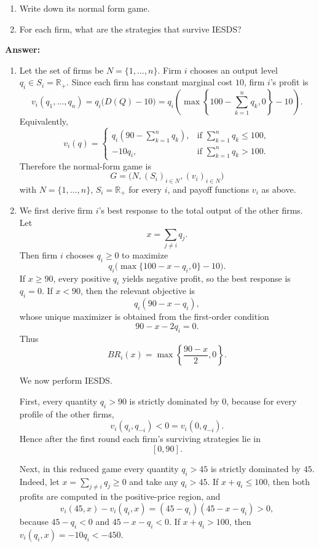 \documentclass[12pt,a4paper]{article}
\begin{document}
\vspace{0.5cm}

\begin{enumerate}[label=(\alph*)]
  \item Write down its normal form game.
  \item For each firm, what are the strategies that survive IESDS?
\end{enumerate}

\vspace{0.5cm}

\noindent\textbf{Answer:}
\begin{enumerate}[label=(\alph*)]
  \item Let the set of firms be $N=\{1,\dots,n\}$. Firm $i$ chooses an output level $q_i\in S_i=\mathbb{R}_{+}$. 
  Since each firm has constant marginal cost $10$, firm $i$'s profit is
  \[
    v_i(q_1,\dots,q_n)=q_i\bigl(D(Q)-10\bigr)
    =q_i\left(\max\left\{100-\sum_{k=1}^n q_k,0\right\}-10\right).
  \]
  Equivalently,
  \[
    v_i(q)=
    \begin{cases}
      q_i\left(90-\sum_{k=1}^n q_k\right), & \text{if } \sum_{k=1}^n q_k\le 100,\\[6pt]
      -10q_i, & \text{if } \sum_{k=1}^n q_k>100.
    \end{cases}
  \]
  Therefore the normal-form game is
  \[
    G=\bigl(N,(S_i)_{i\in N},(v_i)_{i\in N}\bigr)
  \]
  with $N=\{1,\dots,n\}$, $S_i=\mathbb{R}_{+}$ for every $i$, and payoff functions $v_i$ as above.

  \item We first derive firm $i$'s best response to the total output of the other firms. Let
  \[
    x=\sum_{j\ne i} q_j.
  \]
  Then firm $i$ chooses $q_i\ge 0$ to maximize
  \[
    q_i\bigl(\max\{100-x-q_i,0\}-10\bigr).
  \]
  If $x\ge 90$, every positive $q_i$ yields negative profit, so the best response is $q_i=0$. If $x<90$, then the relevant objective is
  \[
    q_i(90-x-q_i),
  \]
  whose unique maximizer is obtained from the first-order condition
  \[
    90-x-2q_i=0.
  \]
  Thus
  \[
    BR_i(x)=\max\left\{\frac{90-x}{2},0\right\}.
  \]

  We now perform IESDS.

  First, every quantity $q_i>90$ is strictly dominated by $0$, because for every profile of the other firms,
  \[
    v_i(q_i,q_{-i})<0=v_i(0,q_{-i}).
  \]
  Hence after the first round each firm's surviving strategies lie in
  \[
    [0,90].
  \]

  Next, in this reduced game every quantity $q_i>45$ is strictly dominated by $45$. Indeed, let $x=\sum_{j\ne i}q_j\ge 0$ and take any $q_i>45$. If $x+q_i\le 100$, then both profits are computed in the positive-price region, and
  \[
    v_i(45,x)-v_i(q_i,x)
    =(45-q_i)(45-x-q_i)>0,
  \]
  because $45-q_i<0$ and $45-x-q_i<0$. If $x+q_i>100$, then $v_i(q_i,x)=-10q_i<-450$. 


\end{enumerate}
\end{document}
